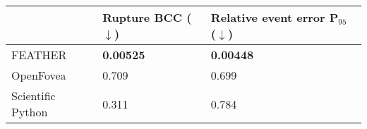 \begin{tabularx}{\textwidth}{ l | l | l  }
 & Rupture BCC ($\downarrow$) & Relative event error P$_{95}$ ($\downarrow$)\\ \hline \hline 
FEATHER & \textbf{0.00525} & \textbf{0.00448}\\ \hline
OpenFovea & 0.709 & 0.699\\ \hline
Scientific Python & 0.311 & 0.784\\ \hline

\end{tabularx}